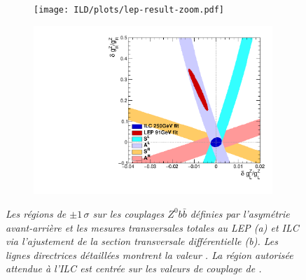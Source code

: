 \begin{figure}
	\centering
	\begin{subfigure}{0.5\textwidth}
		\texttt{[image: ILD/plots/lep-result-zoom.pdf]}
		\caption{\label{fig:LEPILCResult_a_3F} }
	\end{subfigure}%
	\begin{subfigure}{0.5\textwidth}
		\centering
		\includegraphics[width=0.99\textwidth]{ILD/plots/ilc-result.pdf}
		\caption{\label{fig:LEPILCResult_b_3F} }
	\end{subfigure}
	\caption{\sl Les régions de $\pm 1\,\sigma$ sur les couplages $Z^0b\bar{b}$ définies par l'asymétrie avant-arrière et les mesures transversales totales au LEP (a) et ILC via l'ajustement de la section transversale différentielle (b). Les lignes directrices détaillées montrent la valeur \sm. La région autorisée attendue à l'ILC est centrée sur les valeurs de couplage de \sm.}
	\label{fig:LEPILCResult_3F}
\end{figure}







